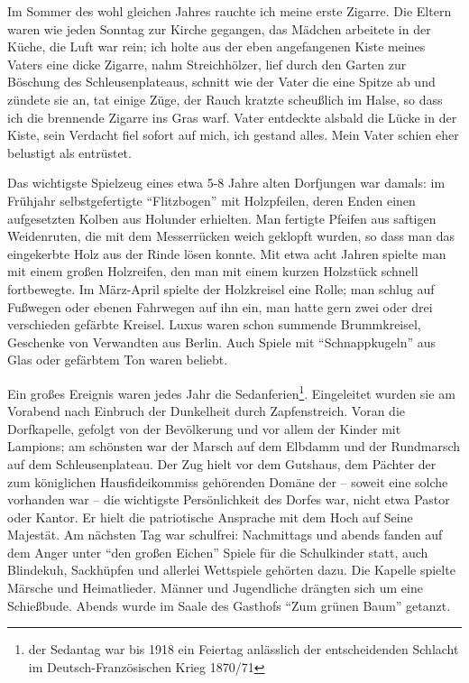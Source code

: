 Im Sommer des wohl gleichen Jahres rauchte ich meine erste Zigarre. Die Eltern waren wie jeden Sonntag zur Kirche gegangen, das Mädchen arbeitete in der Küche, die Luft war rein; ich holte aus der eben angefangenen Kiste meines Vaters eine dicke Zigarre, nahm Streichhölzer, lief durch den Garten zur Böschung des Schleusenplateaus, schnitt wie der Vater die eine Spitze ab und zündete sie an, tat einige Züge, der Rauch kratzte scheußlich im Halse, so dass ich die brennende Zigarre ins Gras warf. Vater entdeckte alsbald die Lücke in der Kiste, sein Verdacht fiel sofort auf mich, ich gestand alles. Mein Vater schien eher belustigt als entrüstet.

Das wichtigste Spielzeug eines etwa 5-8 Jahre alten Dorfjungen war damals: im Frühjahr selbstgefertigte \enquote{Flitzbogen} mit Holzpfeilen, deren Enden einen aufgesetzten Kolben aus Holunder erhielten. Man fertigte Pfeifen aus saftigen Weidenruten, die mit dem Messerrücken weich geklopft wurden, so dass man das eingekerbte Holz aus der Rinde lösen konnte. Mit etwa acht Jahren spielte man mit einem großen Holzreifen, den man mit einem kurzen Holzstück schnell fortbewegte. Im März-April spielte der Holzkreisel eine Rolle; man schlug auf Fußwegen oder ebenen Fahrwegen auf ihn ein, man hatte gern zwei oder drei verschieden gefärbte Kreisel. Luxus waren schon summende Brummkreisel, Geschenke von Verwandten aus Berlin. Auch Spiele mit \enquote{Schnappkugeln} aus Glas oder gefärbtem Ton waren beliebt.

Ein großes Ereignis waren jedes Jahr die Sedanferien\footnote{der Sedantag war bis 1918 ein Feiertag anlässlich der entscheidenden Schlacht im Deutsch-Französischen Krieg 1870/71}. Eingeleitet wurden sie am Vorabend nach Einbruch der Dunkelheit durch Zapfenstreich. Voran die Dorfkapelle, gefolgt von der Bevölkerung und vor allem der Kinder mit Lampions; am schönsten war der Marsch auf dem Elbdamm und der Rundmarsch auf dem Schleusenplateau. Der Zug hielt vor dem Gutshaus, dem Pächter der zum königlichen Hausfideikommiss gehörenden Domäne der -- soweit eine solche vorhanden war -- die wichtigste Persönlichkeit des Dorfes war, nicht etwa Pastor oder Kantor. Er hielt die patriotische Ansprache mit dem Hoch auf Seine Majestät. Am nächsten Tag war schulfrei: Nachmittags und abends fanden auf dem Anger unter \enquote{den großen Eichen} Spiele für die Schulkinder statt, auch Blindekuh, Sackhüpfen und allerlei Wettspiele gehörten dazu. Die Kapelle spielte Märsche und Heimatlieder. Männer und Jugendliche drängten sich um eine Schießbude. Abends wurde im Saale des Gasthofs \enquote{Zum grünen Baum} getanzt.

